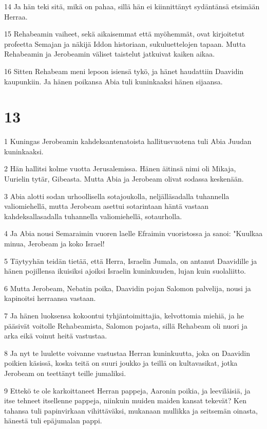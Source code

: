 \par 14 Ja hän teki sitä, mikä on pahaa, sillä hän ei kiinnittänyt sydäntänsä etsimään Herraa.
\par 15 Rehabeamin vaiheet, sekä aikaisemmat että myöhemmät, ovat kirjoitetut profeetta Semajan ja näkijä Iddon historiaan, sukuluettelojen tapaan. Mutta Rehabeamin ja Jerobeamin väliset taistelut jatkuivat kaiken aikaa.
\par 16 Sitten Rehabeam meni lepoon isiensä tykö, ja hänet haudattiin Daavidin kaupunkiin. Ja hänen poikansa Abia tuli kuninkaaksi hänen sijaansa.

\chapter{13}

\par 1 Kuningas Jerobeamin kahdeksantenatoista hallitusvuotena tuli Abia Juudan kuninkaaksi.
\par 2 Hän hallitsi kolme vuotta Jerusalemissa. Hänen äitinsä nimi oli Mikaja, Uurielin tytär, Gibeasta. Mutta Abia ja Jerobeam olivat sodassa keskenään.
\par 3 Abia alotti sodan urhoollisella sotajoukolla, neljälläsadalla tuhannella valiomiehellä, mutta Jerobeam asettui sotarintaan häntä vastaan kahdeksallasadalla tuhannella valiomiehellä, sotaurholla.
\par 4 Ja Abia nousi Semaraimin vuoren laelle Efraimin vuoristossa ja sanoi: "Kuulkaa minua, Jerobeam ja koko Israel!
\par 5 Täytyyhän teidän tietää, että Herra, Israelin Jumala, on antanut Daavidille ja hänen pojillensa ikuisiksi ajoiksi Israelin kuninkuuden, lujan kuin suolaliitto.
\par 6 Mutta Jerobeam, Nebatin poika, Daavidin pojan Salomon palvelija, nousi ja kapinoitsi herraansa vastaan.
\par 7 Ja hänen luoksensa kokoontui tyhjäntoimittajia, kelvottomia miehiä, ja he pääsivät voitolle Rehabeamista, Salomon pojasta, sillä Rehabeam oli nuori ja arka eikä voinut heitä vastustaa.
\par 8 Ja nyt te luulette voivanne vastustaa Herran kuninkuutta, joka on Daavidin poikien käsissä, koska teitä on suuri joukko ja teillä on kultavasikat, jotka Jerobeam on teettänyt teille jumaliksi.
\par 9 Ettekö te ole karkoittaneet Herran pappeja, Aaronin poikia, ja leeviläisiä, ja itse tehneet itsellenne pappeja, niinkuin muiden maiden kansat tekevät? Ken tahansa tuli papinvirkaan vihittäväksi, mukanaan mullikka ja seitsemän oinasta, hänestä tuli epäjumalan pappi.
